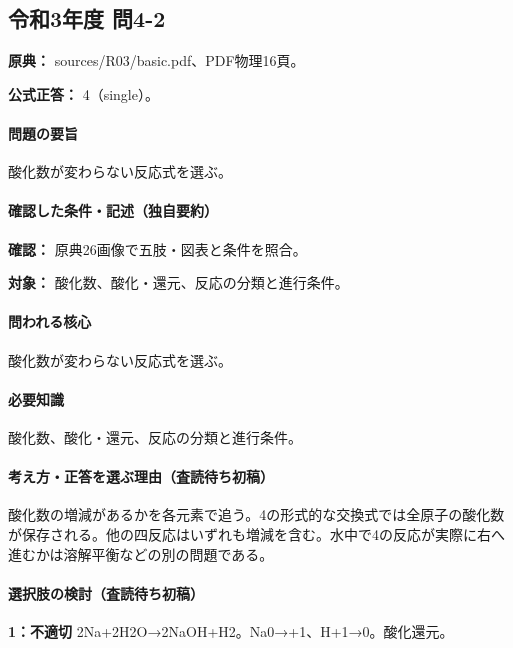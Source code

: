 \subsection{令和3年度 問4-2}
\label{q:r03-reg-basic-4-2}

\noindent\textbf{原典：} sources/R03/basic.pdf、PDF物理16頁。

\textbf{公式正答：} 4（single）。

\paragraph{問題の要旨} 酸化数が変わらない反応式を選ぶ。

\paragraph{確認した条件・記述（独自要約）}\mbox{}\par

\noindent\textbf{確認：} 原典26画像で五肢・図表と条件を照合。\par

\noindent\textbf{対象：} 酸化数、酸化・還元、反応の分類と進行条件。\par

\paragraph{問われる核心} 酸化数が変わらない反応式を選ぶ。

\paragraph{必要知識} 酸化数、酸化・還元、反応の分類と進行条件。

\paragraph{考え方・正答を選ぶ理由（査読待ち初稿）} 酸化数の増減があるかを各元素で追う。4の形式的な交換式では全原子の酸化数が保存される。他の四反応はいずれも増減を含む。水中で4の反応が実際に右へ進むかは溶解平衡などの別の問題である。

\paragraph{選択肢の検討（査読待ち初稿）}\mbox{}\par

\noindent\textbf{1：不適切} 2Na+2H2O→2NaOH+H2。Na0→+1、H+1→0。酸化還元。\par

